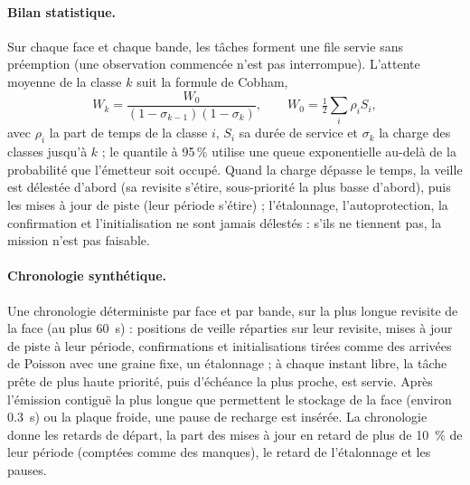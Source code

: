 \documentclass[11pt,a4paper]{article}
\begin{document}
\paragraph{Bilan statistique.} Sur chaque face et chaque bande, les tâches forment une file servie sans préemption
(une observation commencée n'est pas interrompue). L'attente moyenne de la classe $k$ suit la formule de Cobham,
\[
  W_k = \frac{W_0}{(1-\sigma_{k-1})(1-\sigma_k)},\qquad W_0 = \tfrac12\textstyle\sum_i \rho_i S_i,
\]
avec $\rho_i$ la part de temps de la classe $i$, $S_i$ sa durée de service et $\sigma_k$ la charge des classes jusqu'à
$k$ ; le quantile à 95\,\% utilise une queue exponentielle au-delà de la probabilité que l'émetteur soit occupé. Quand
la charge dépasse le temps, la veille est délestée d'abord (sa revisite s'étire, sous-priorité la plus basse d'abord),
puis les mises à jour de piste (leur période s'étire) ; l'étalonnage, l'autoprotection, la confirmation et
l'initialisation ne sont jamais délestés : s'ils ne tiennent pas, la mission n'est pas faisable.

\paragraph{Chronologie synthétique.} Une chronologie déterministe par face et par bande, sur la plus longue revisite
de la face (au plus \SI{60}{s}) : positions de veille réparties sur leur revisite, mises à jour de piste à leur
période, confirmations et initialisations tirées comme des arrivées de Poisson avec une graine fixe, un étalonnage ; à
chaque instant libre, la tâche prête de plus haute priorité, puis d'échéance la plus proche, est servie. Après
l'émission contiguë la plus longue que permettent le stockage de la face (environ \SI{0.3}{s}) ou la plaque froide, une
pause de recharge est insérée. La chronologie donne les retards de départ, la part des mises à jour en retard de plus
de \SI{10}{\percent} de leur période (comptées comme des manques), le retard de l'étalonnage et les pauses.
\end{document}
